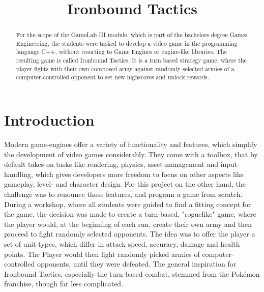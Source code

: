 \documentclass[conference]{IEEEtran}
\begin{document}
\title{Ironbound Tactics\\

}

\author{

}

\maketitle

\begin{abstract}
For the scope of the  GameLab III module, which is part of the bachelors degree Games Engineering, the students
were tasked to develop a video game in the programming language C++, without resorting to Game Engines
or engine-like libraries.
The resulting game is called Ironbound Tactics.
It is a turn based strategy game, where the player fights with their own composed army against randomly selected
armies of a computer-controlled opponent to set new highscores and unlock rewards.
 
\end{abstract}


\section{Introduction}
Modern game-engines offer a variety of functionality and features, which simplify  the development of video games
considerably.
They come with a toolbox, that by default takes on tasks like rendering, physics, asset-management and
input-handling, which gives developers more freedom to focus on other aspects like gameplay, level- and
character design.
For this project on the other hand, the challenge was to renounce those features, and program a game from scratch.
During a workshop, where all students were guided to find a fitting concept for the game, the decision was made to create a
turn-based, "roguelike" game, where the player would, at the beginning of each run, create their own army and then proceed
to fight randomly selected opponents.
The idea was to offer the player a set of unit-types, which differ in attack speed, accuracy, damage and health points.
The Player would then fight randomly picked armies of computer-controlled opponents, until they were defeated.
The general inspiration for Ironbound Tactics, especially the turn-based combat, stemmed from the Pokémon \cite{b1}
franchise, though far less complicated.
\end{document}
